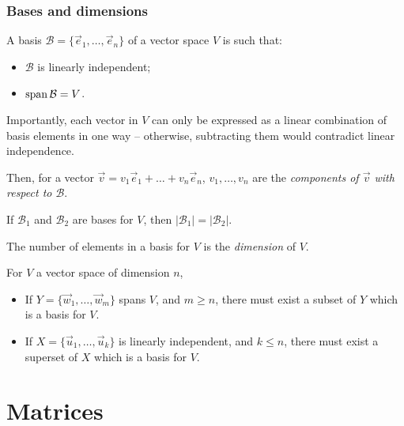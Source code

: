 \documentclass{../../template/note}
\begin{document}
    \subsubsection{Bases and dimensions}
    
    \begin{definition}
        A basis \(\mathcal B = \{\vec e_1, \dots, \vec e_n\}\) of a vector space \(V\) is such that:
        \begin{itemize}
            \item \(\mathcal B\) is linearly independent;
            \item \(\operatorname{span} \mathcal B = V\).
        \end{itemize}
        Importantly, each vector in \(V\) can only be expressed as a linear combination of basis elements in one way -- otherwise, subtracting them would contradict linear independence.

        Then, for a vector \(\vec v = v_1 \vec e_1 + \dots + v_n \vec e_n\), \(v_1, \dots, v_n\) are the \emph{components of \(\vec v\) with respect to \(\mathcal B\)}.
    \end{definition}

    \begin{theorem}
        If \(\mathcal B_1\) and \(\mathcal B_2\) are bases for \(V\), then \(|\mathcal B_1| = |\mathcal B_2|\).
    \end{theorem}
    
    \begin{definition}
        The number of elements in a basis for \(V\) is the \emph{dimension} of \(V\).
    \end{definition}
    
    \begin{proposition}
        For \(V\) a vector space of dimension \(n\),
        \begin{itemize}
            \item If \(Y = \{\vec w_1, \dots, \vec w_m\}\) spans \(V\), and \(m \geq n\), there must exist a subset of \(Y\) which is a basis for \(V\).
            \item If \(X = \{\vec u_1, \dots, \vec u_k\}\) is linearly independent, and \(k \leq n\), there must exist a superset of \(X\) which is a basis for \(V\).
        \end{itemize}
    \end{proposition}

    
    \section{Matrices}
\end{document}
